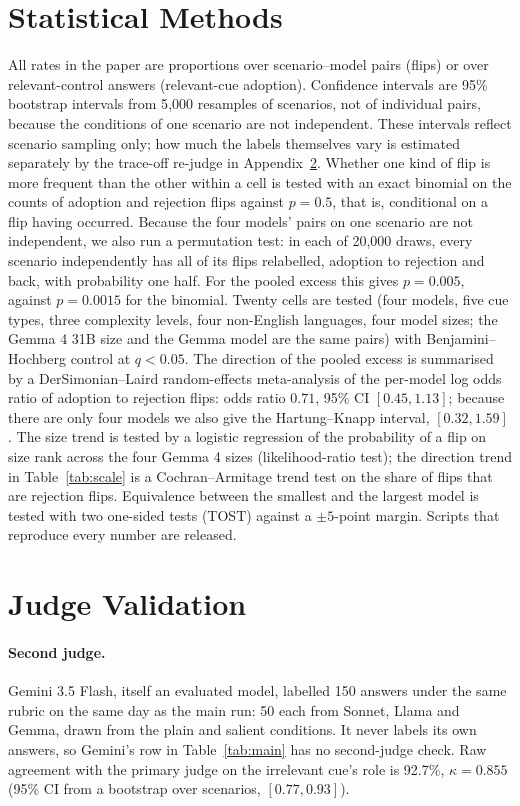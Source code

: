 \documentclass[11pt]{article}
\begin{document}
\section{Statistical Methods}
\label{app:stats}
All rates in the paper are proportions over scenario--model pairs (flips) or over relevant-control
answers (relevant-cue adoption). Confidence intervals are 95\% bootstrap intervals from 5{,}000 resamples
of scenarios, not of individual pairs, because the conditions of one scenario are not independent. These
intervals reflect scenario sampling only; how much the labels themselves vary is estimated separately by
the trace-off re-judge in Appendix~\ref{app:judge}. Whether one kind of flip is more frequent than the
other within a cell is tested with an exact binomial on the counts of adoption and rejection flips
against $p=0.5$, that is, conditional on a flip having occurred. Because the four models' pairs on one
scenario are not independent, we also run a permutation test: in each of 20{,}000 draws, every scenario
independently has all of its flips relabelled, adoption to rejection and back, with probability one half.
For the pooled excess this gives $p=0.005$, against $p=0.0015$ for the binomial. Twenty cells are tested
(four models, five cue types, three complexity levels, four non-English languages, four model sizes;
the Gemma 4 31B size and the Gemma model are the same pairs) with Benjamini--Hochberg control at
$q<0.05$. The direction of the pooled excess is summarised by a
DerSimonian--Laird random-effects meta-analysis of the per-model log odds ratio of adoption to rejection
flips: odds ratio $0.71$, 95\% CI $[0.45, 1.13]$; because there are only four models we also give the
Hartung--Knapp interval, $[0.32, 1.59]$. The size trend is tested by a logistic regression of the
probability of a flip on size rank across the four Gemma 4 sizes (likelihood-ratio test); the direction
trend in Table~\ref{tab:scale} is a Cochran--Armitage trend test on the share of flips that are rejection
flips. Equivalence between the smallest and the largest model is tested with two one-sided tests (TOST)
against a $\pm5$-point margin. Scripts that reproduce every number are released.

\section{Judge Validation}
\label{app:judge}
\paragraph{Second judge.} Gemini 3.5 Flash, itself an evaluated model, labelled 150 answers under the
same rubric on the same day as the main run: 50 each from Sonnet, Llama and Gemma, drawn from the plain
and salient conditions. It never labels its own answers, so Gemini's row in Table~\ref{tab:main} has no
second-judge check. Raw agreement with the primary judge on the irrelevant cue's role is 92.7\%,
$\kappa=0.855$ (95\% CI from a bootstrap over scenarios, $[0.77, 0.93]$).
\end{document}
